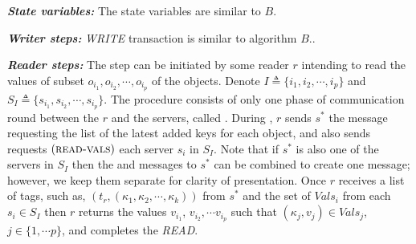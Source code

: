 \textit{\textbf{State variables:}} The state variables are similar to  $B$.
			
\textit{\textbf{Writer steps:}} \emph{WRITE} transaction is similar to algorithm $B$..



\textit{\textbf{Reader steps:}}  
The step   can be 
initiated by  some reader  $r$ intending to read the values of 
subset $o_{i_1},  o_{i_2}, \cdots, o_{i_p}$ of the objects. 
Denote  $I \triangleq \{i_1, i_2, \cdots, i_p\}$  and $S_I\triangleq \{s_{i_1}, s_{i_2}, \cdots, s_{i_p}\}$.
The procedure 
consists of only one  phase  of communication round
between the $r$ and the  servers, called  {\readValuesAndTags}. 
%
During  {\readValuesAndTags},  $r$ sends $s^*$ the message  {\getTagArrayTag}  
 requesting the  list of the latest added keys for each object, and also sends
    requests $(\text{{\sc read-vals}})$  each server $s_i$ in $S_I$. Note that if $s^*$ is also one of the 
    servers in $S_I$ then the {\getTagArrayTag} and  {\readValuesTag} messages to $s^*$ can be combined to create one message; however, we keep them separate for clarity of presentation.
% 
 Once $r$ receives a list of tags, such as, $(t_r, ({\kappa}_1, {\kappa}_2, \cdots,  {\kappa}_k))$ from $s^*$  and 
 the set of $Vals_{i}$ from each $s_i \in S_I$ then $r$ returns  the values 
 $v_{i_1}$, $v_{i_2}, \cdots v_{i_p}$ such that   $({\kappa}_{j}, v_{j}) \in Vals_{j}$, $j\in \{1, \cdots p\}$, and completes the 
\textit{READ}.
%
%


